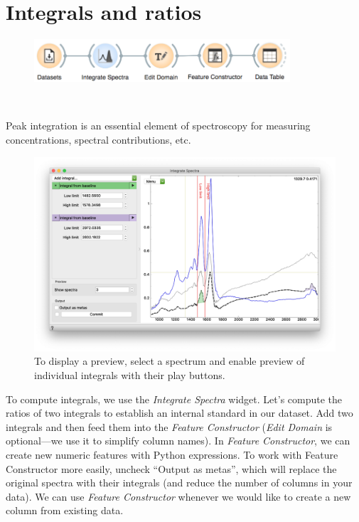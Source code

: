 \chapter{Integrals and ratios}
\label{ch:spectral_preprocessing}

\begin{figure}[h]
    \centering
    \vspace{-1cm}
    \includegraphics[width=0.85\textwidth]{integrals-ratios-fig1.png}
    \label{fig:integrals-ratios-fig1}
    \caption{$\;$}
\end{figure}

Peak integration is an essential element of spectroscopy for measuring concentrations, spectral contributions, etc. 

\begin{figure}
    \centering
    \includegraphics[width=\textwidth]{integrals-ratios-fig2.png}
    \caption{To display a preview, select a spectrum and enable preview of individual integrals with their play buttons.}
    \label{fig:integrals-ratios-fig2}
\end{figure}

To compute integrals, we use the \textit{Integrate Spectra} widget. Let’s compute the ratios of two integrals to establish an internal standard in our dataset. Add two integrals and then feed them into the \textit{Feature Constructor} (\textit{Edit Domain} is optional—we use it to simplify column names). In \textit{Feature Constructor}, we can create new numeric features with Python expressions.
To work with Feature Constructor more easily, uncheck “Output as metas”, which will replace the original spectra with their integrals (and reduce the number of columns in your data).
We can use \textit{Feature Constructor} whenever we would like to create a new column from existing data. 

